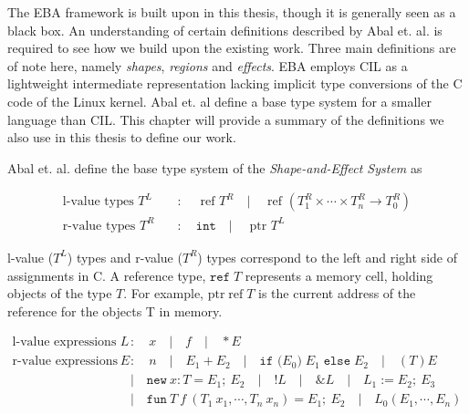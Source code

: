 \newpar The EBA framework is built upon in this thesis, though it is generally seen as a black box. An understanding of certain definitions described by Abal et. al. \cite{Abal2017EffectiveBF} is required to see how we build upon the existing work. Three main definitions are of note here, namely \textit{shapes}, \textit{regions} and \textit{effects}. EBA employs CIL \cite{cil} as a lightweight intermediate representation lacking implicit type conversions of the C code of the Linux kernel. Abal et. al define a base type system for a smaller language than CIL. This chapter will provide a summary of the definitions we also use in this thesis to define our work. 

\newpar Abal et. al. define the base type system of the \textit{Shape-and-Effect System} as 

\begin{equation*}
\begin{aligned}
    \text {l-value types } T^{L} \quad &: \quad \text{ ref } T^{R} \quad | \quad \text{ ref } \left(T_{1}^{R} \times \cdots \times T_{n}^{R} \rightarrow T_{0}^{R}\right)\\
    \text {r-value types } T^{R} \quad &: \quad \texttt{int} \quad | \quad \text{ ptr } T^{L}
\end{aligned}
\end{equation*}

\newpar l-value ($T^{L}$) types and r-value ($T^{R}$) types correspond to the left and right side of assignments in C. A reference type, $\texttt{ref} \; T$ represents a memory cell, holding objects of the type $T$. For example, $\text{ptr}\;\text{ref}\;T$ is the current address of the reference for the objects T in memory. 

\begin{equation*}
\begin{aligned}
    \text {l-value expressions } L \quad &: \quad x \quad | \quad f \quad | \quad *E \\
    \text{r-value expressions } E \quad &: \quad n \quad | \quad E_{1}+E_{2} \quad | \quad \texttt{if (}E_0\texttt{)} \; E_1 \; \texttt{else} \; E_2 \quad | \quad (T) E \\
    &| \quad \texttt{new} \: x : T=E_1 ;\: E_2 \quad | \quad !L \quad | \quad \& L \quad | \quad L_1 := E_2 ;\: E_3 \\
    &| \quad \texttt{fun} \:T\:f\:(T_1\:x_1, \cdots, T_n\:x_n) = E_1 ;\: E_2 \quad | \quad L_0(E_1, \cdots, E_n)
\end{aligned}
\end{equation*}

